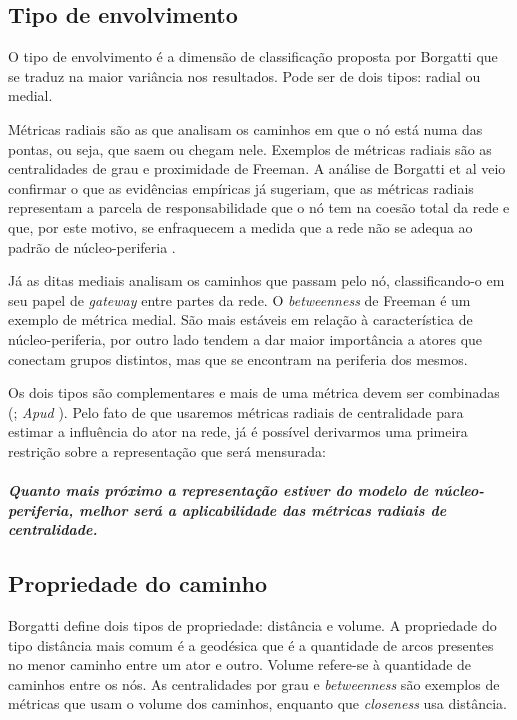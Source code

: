 \documentclass{article}
\begin{document}
\subsection{Tipo de envolvimento} 

O tipo de envolvimento é a dimensão de classificação proposta por Borgatti que
se traduz na maior variância nos resultados. Pode ser de dois tipos: radial ou
medial.

Métricas radiais são as que analisam os caminhos em que o nó está numa das
pontas, ou seja, que saem ou chegam nele. Exemplos de métricas radiais são as
centralidades de grau e proximidade de Freeman. A análise de Borgatti et al veio
confirmar o que as evidências empíricas já sugeriam, que as métricas radiais
representam a parcela de responsabilidade que o nó tem na coesão total da rede e
que, por este motivo, se enfraquecem a medida que a rede não se adequa ao padrão
de núcleo-periferia \cite{Nakao1990}.

Já as ditas mediais analisam os caminhos que passam pelo nó, classificando-o em
seu papel de \textit{gateway} entre partes da rede. O \textit{betweenness} de
Freeman é um exemplo de métrica medial. São mais estáveis em relação à
característica de núcleo-periferia, por outro lado tendem a dar maior importância
a atores que conectam grupos distintos, mas que se encontram na periferia dos
mesmos.

Os dois tipos são complementares e mais de uma métrica devem ser combinadas
(\cite{Stephenson1989}; \textit{Apud} \cite{Wasserman}). Pelo fato de que
usaremos métricas radiais de centralidade para estimar a influência do ator na
rede, já é possível derivarmos uma primeira restrição sobre a representação que
será mensurada:
\paragraph{
\emph{Quanto mais próximo a representação estiver do modelo de núcleo-periferia,
melhor será a aplicabilidade das métricas radiais de centralidade.}}

\subsection{Propriedade do caminho}

Borgatti define dois tipos de propriedade: distância e volume. A
propriedade do tipo distância mais comum é a geodésica que é a quantidade de
arcos presentes no menor caminho entre um ator e outro. Volume refere-se à
quantidade de caminhos entre os nós. As centralidades por grau e
\textit{betweenness} são exemplos de métricas que usam o volume dos caminhos,
enquanto que \textit{closeness} usa distância.
\end{document}
